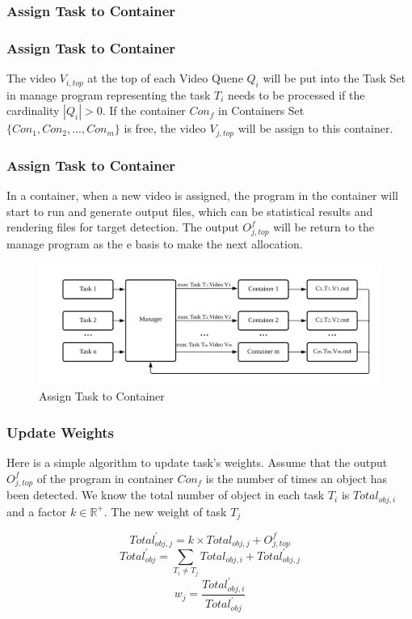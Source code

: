 \documentclass{beamer}
\begin{document}
\subsubsection{Assign Task to Container}
\begin{frame}
    \frametitle{Assign Task to Container}
    The video $V_{i,top}$ at the top of each Video Quene $Q_i$ will be put into the Task Set in manage program representing the task $T_i$ needs to be processed if the cardinality $|Q_i|>0$.  If the container $Con_f$ in Containers Set $\{Con_1,Con_2,...,Con_m\}$ is free, the video $V_{j,top}$ will be assign to this container. 
\end{frame}
\begin{frame}
    \frametitle{Assign Task to Container} 
    In a container, when a new video is assigned, the program in the container will start to run and generate output files, which can be statistical results and rendering files for target detection. The output $O_{j,top}^f$ will be return to the manage program as the e basis to make the next allocation.
    \begin{figure}[H]
        \centering
        \includegraphics[width=01\textwidth]{img/report3.png}
        \caption{Assign Task to Container}
        \label{img3} 
    \end{figure}
\end{frame}
\begin{frame}
    \frametitle{Update Weights} 
    Here is a simple algorithm to update task's weights. Assume that the output $O_{j,top}^f$ of the program in container $Con_f$ is the number of times an object has been detected. We know the total number of object in each task $T_i$ is $Total_{obj,i}$ and a factor $k\in \mathbb{R}^+$. The new weight of task $T_j$

    $$Total_{obj,j}^{'}=k\times Total_{obj,j}+O_{j,top}^f$$
    $$Total_{obj}^{'}=\sum_{T_i\neq T_j} Total_{obj,i}+Total_{obj,j}^{'}$$
    $$w_j=\frac{Total_{obj,i}^{'}}{Total_{obj}^{'}}$$
\end{frame}
\end{document}
